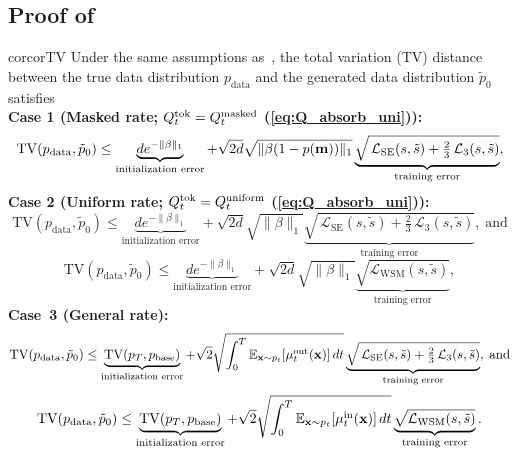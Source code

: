 \documentclass{article} %
\def\eqref#1{equation~\ref{#1}}
\newcommand{\bfx}{{\bf x}}
\newcommand{\bfm}{{\bf m}}
\newcommand{\TV}{\mathrm{TV}}
\newcommand{\LWSM}{\mathcal{L}_{\mathrm{WSM}}}
\newcommand{\LSE}{\mathcal{L}_{\mathrm{SE}}}
\renewcommand{\eqref}[1]{\textup{(\ref{#1})}}
\newcommand{\LThree}{\mathcal{L}_{3}}
\begin{document}
\subsection{Proof of \texorpdfstring{}{Theorem \ref*{cor:TV}}}\label{subsec:proofTV}
\begin{restatable}{cor}{corTV}\label{cor:TV}
Under the same assumptions as~, the total variation (TV) distance between the true data distribution $p_{\mathrm{data}}$ and the generated data distribution $\tilde{p}_0$ satisfies \\
\textbf{Case 1 (Masked rate; $Q^{\mathrm{tok}}_t=Q_t^{\rm masked}$ \eqref{eq:Q_absorb_uni}):}
\begin{equation}\label{eq:TV_masked_bound}
    \TV(p_{\mathrm{data}}, \tilde{p}_0) \leq  \underbrace{d e^{-\| \beta \|_1}}_{\text{initialization error}}  +  \sqrt{2d} \sqrt{\| \beta (1-p(\bfm))\|_1}  \underbrace{\sqrt{ \,\LSE(s, \tilde{s}) + \tfrac{2}{3}\,\LThree(s, \tilde{s})}}_{\text{training error}} ,
\end{equation}
\textbf{Case 2 (Uniform rate; $Q^{\mathrm{tok}}_t=Q_t^{\rm uniform}$ \eqref{eq:Q_absorb_uni}):} 
\begin{equation}
    \TV(p_{\mathrm{data}}, \tilde{p}_0) \leq  \underbrace{d e^{-\| \beta \|_1}}_{\text{initialization error}} +  \sqrt{2d} \sqrt{\|\beta \|_1}  \underbrace{\sqrt{\,\LSE(s, \tilde{s}) + \tfrac{2}{3}\,\LThree(s, \tilde{s})}}_{\text{training error}} , \; \text{and}
\end{equation}
    \begin{equation}\label{eq:TV_uniform_bound_LWSM}
    \TV(p_{\mathrm{data}}, \tilde{p}_0) \leq  \underbrace{d e^{-\| \beta \|_1}}_{\text{initialization error}}  +  \sqrt{2d} \sqrt{\|\beta \|_1}  \underbrace{\sqrt{\LWSM(s, \tilde{s})}}_{\text{training error}},
\end{equation}
\textbf{Case~3 (General rate):} 
\begin{equation}
    \TV(p_{\mathrm{data}}, \tilde{p}_0)  \leq  \underbrace{\TV(p_T, p_{\rm base})}_{\text{initialization error}} +  \sqrt{2} \sqrt{ \int_0^T \mathbb{E}_{\bfx \sim p_t}\!\left[ \mu^\mathrm{out}_t(\bfx) \right] dt }  \underbrace{\sqrt{\,\LSE(s, \tilde{s}) + \tfrac{2}{3}\,\LThree(s, \tilde{s})}}_{\text{training error}}, \; \text{and}
\end{equation}
\begin{equation}
    \TV(p_{\mathrm{data}}, \tilde{p}_0)  \leq  \underbrace{\TV(p_T, p_{\rm base})}_{\text{initialization error}} +  \sqrt{2} \sqrt{ \int_0^T \mathbb{E}_{\bfx \sim p_t}\!\left[ \mu^\mathrm{in}_t(\bfx) \right] dt }  \underbrace{\sqrt{\LWSM(s, \tilde{s})}}_{\text{training error}} .
\end{equation}
\end{restatable}
\end{document}
